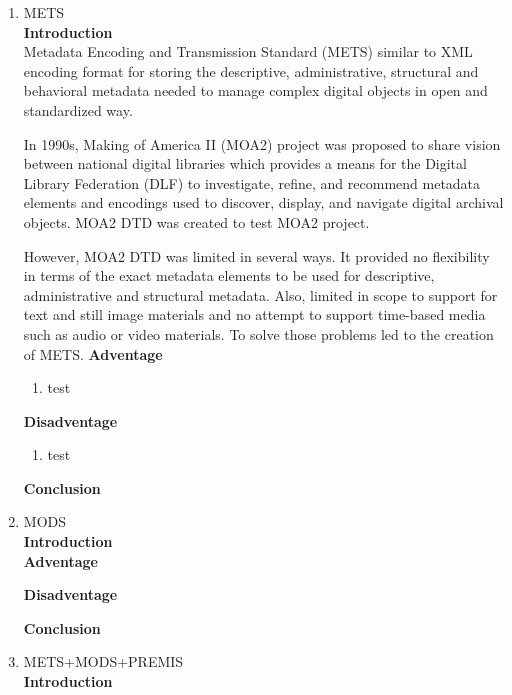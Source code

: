 \documentclass[a4paper]{article} %
\begin{document}
\begin{enumerate}
	\item METS\\
	{\bf Introduction}\\
	Metadata Encoding and Transmission Standard (METS) similar to XML encoding format for storing the descriptive, administrative, structural and behavioral metadata needed to manage complex digital objects in open and standardized way.
	
	In 1990s, Making of America II (MOA2) project was proposed to share vision between national digital libraries which provides a means for the Digital Library Federation (DLF) to investigate, refine, and recommend metadata elements and encodings used to discover, display, and navigate digital archival objects. MOA2 DTD was created to test MOA2 project.
	
	However, MOA2 DTD was limited in several ways. It provided no flexibility in terms of the exact metadata elements to be used for descriptive, administrative and structural metadata. Also, limited in scope to support for text and still image materials and no attempt to support time-based media such as audio or video materials. To solve those problems led to the creation of METS.
	{\bf Adventage}
	\begin{enumerate}
		\item test
	\end{enumerate}	
	{\bf Disadventage}
	\begin{enumerate}
		\item test
	\end{enumerate}
	{\bf Conclusion}\\	
	
	\item MODS\\
	{\bf Introduction}\\
	
	{\bf Adventage}
	\begin{enumerate}
		
	\end{enumerate}	
	{\bf Disadventage}
	\begin{enumerate}
		
	\end{enumerate}
	{\bf Conclusion}\\
	
	\item METS+MODS+PREMIS\\
	{\bf Introduction}\\
	

\end{enumerate}
\end{document}
